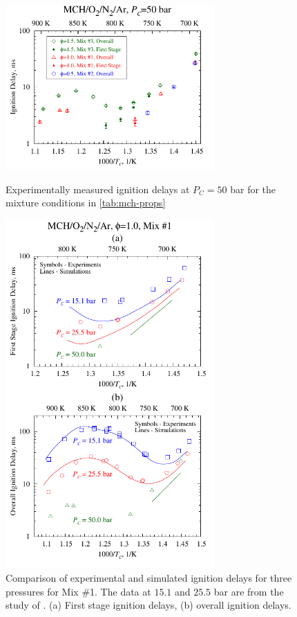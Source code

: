 \documentclass[12pt, letterpaper]{article}
\begin{document}
\begin{figure}
    \centering
    \begin{minipage}{0.45\textwidth}
        \includegraphics[width=8cm]{../figures/05-MCH/mch-expts}    
        \caption{Experimentally measured ignition delays at $P_C=50$ bar for the 
            mixture conditions in \autoref{tab:mch-props}}
        \label{fig:mch-expts}
    \end{minipage}
    \quad
    \begin{minipage}{0.45\textwidth}
        \includegraphics[width=8cm]{../figures/05-MCH/mch-model-1}
        \caption{Comparison of experimental and simulated ignition delays for three 
            pressures for Mix \#1. The data at $15.1$ and $25.5$ bar are from the 
            study of \textcite{Mittal2009}. (a) First stage ignition delays, 
            (b) overall ignition delays.}
        \label{fig:mch-model-1}
    \end{minipage}
\end{figure}
\end{document}
